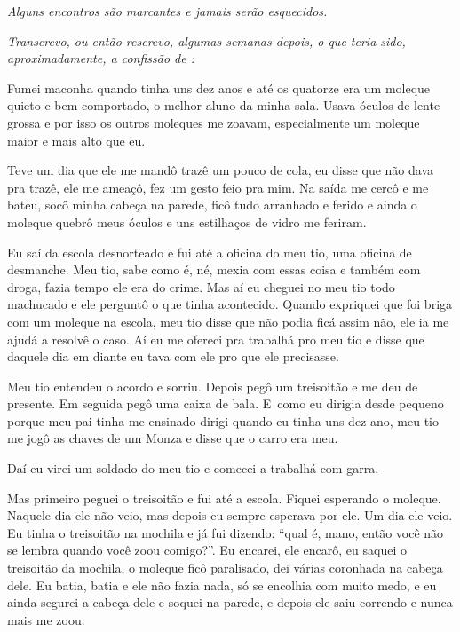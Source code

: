  

\emph{Alguns encontros são marcantes e jamais serão esquecidos.}

\emph{Transcrevo, ou então rescrevo, algumas semanas depois, o que
teria sido, aproximadamente, a confissão de :}

\bigskip{} 

Fumei maconha quando tinha uns dez anos e até os quatorze era um moleque
quieto e bem comportado, o melhor aluno da minha sala. Usava óculos de
lente grossa e por isso os outros moleques me zoavam, especialmente um
moleque maior e mais alto que eu.

Teve um dia que ele me mandô trazê um pouco de cola, eu disse que não
dava pra trazê, ele me ameaçô, fez um gesto feio pra mim. Na saída me
cercô e me bateu, socô minha cabeça na parede, ficô tudo arranhado e
ferido e ainda o moleque quebrô meus óculos e uns estilhaços de vidro me
feriram.

Eu saí da escola desnorteado e fui até a oficina do meu tio, uma oficina
de desmanche. Meu tio, sabe como é, né, mexia com essas coisa e também
com droga, fazia tempo ele era do crime. Mas aí eu cheguei no meu tio
todo machucado e ele perguntô o que tinha acontecido. Quando expriquei
que foi briga com um moleque na escola, meu tio disse que não podia ficá
assim não, ele ia me ajudá a resolvê o caso. Aí eu me ofereci pra
trabalhá pro meu tio e disse que daquele dia em diante eu tava com ele
pro que ele precisasse.

Meu tio entendeu o acordo e sorriu. Depois pegô um treisoitão e me deu
de presente. Em seguida pegô uma caixa de bala. E~como eu dirigia desde
pequeno porque meu pai tinha me ensinado dirigi quando eu tinha uns dez
ano, meu tio me jogô as chaves de um Monza e disse que o carro era meu.

Daí eu virei um soldado do meu tio e comecei a trabalhá com garra.

Mas primeiro peguei o treisoitão e fui até a escola. Fiquei esperando o
moleque. Naquele dia ele não veio, mas depois eu sempre esperava por
ele. Um dia ele veio. Eu tinha o treisoitão na mochila e já fui dizendo:
``qual é, mano, então você não se lembra quando você zoou comigo?''. Eu
encarei, ele encarô, eu saquei o treisoitão da mochila, o moleque ficô
paralisado, dei várias coronhada na cabeça dele. Eu batia, batia e ele
não fazia nada, só se encolhia com muito medo, e eu ainda segurei a
cabeça dele e soquei na parede, e depois ele saiu correndo e nunca mais
me zoou.

